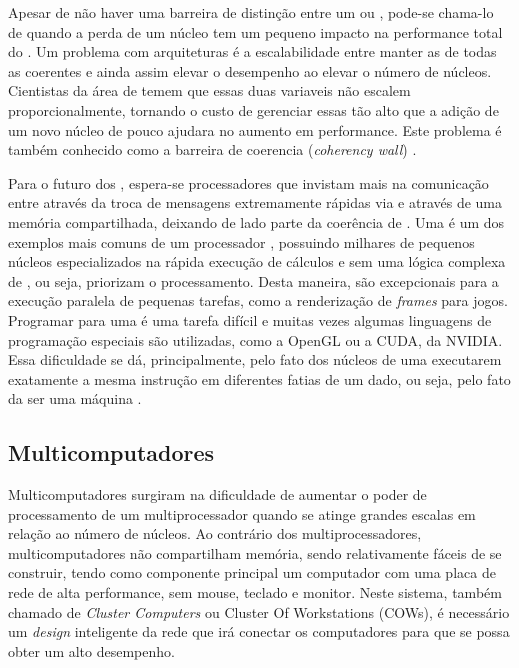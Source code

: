 Apesar de não haver uma barreira de distinção entre um \chip \manycore ou \multicore, pode-se chama-lo de \manycore quando a perda de um núcleo tem um pequeno impacto na performance total do \chip. Um problema com arquiteturas \manycore é a escalabilidade entre manter as \caches de todas as \CPUs coerentes e ainda assim elevar o desempenho ao elevar o número de núcleos. Cientistas da área de \HPC temem que essas duas variaveis não escalem proporcionalmente, tornando o custo de gerenciar essas \caches tão alto que a adição de um novo núcleo de pouco ajudara no aumento em performance. Este problema é também conhecido como a barreira de coerencia  (\textit{coherency wall}) \cite{TanenbaumMordenOS}.

Para o futuro dos \manycore, espera-se processadores que invistam mais  na comunicação entre \CPUs através da troca de mensagens extremamente rápidas via \hardware e através de uma memória compartilhada, deixando de lado parte da coerência de \cache. Uma \GPU é um dos exemplos mais comuns de um processador \manycore, possuindo milhares de pequenos núcleos especializados na rápida execução de cálculos e sem uma lógica complexa de \cache, ou seja, priorizam o processamento. Desta maneira, \GPUs são excepcionais para a execução paralela de pequenas tarefas, como a renderização de \textit{frames} para jogos. Programar para uma \GPU é uma tarefa difícil e muitas vezes algumas linguagens de programação especiais são utilizadas, como a OpenGL ou a CUDA, da NVIDIA. Essa dificuldade se dá, principalmente, pelo fato dos núcleos de uma \GPU executarem exatamente a mesma instrução em diferentes fatias de um dado, ou seja, pelo fato da \GPU ser uma máquina \SIMD.

\subsection{Multicomputadores}
\label{sec:multicomputadores}

Multicomputadores surgiram na dificuldade de aumentar o poder de processamento de um multiprocessador quando se atinge grandes escalas em relação ao número de núcleos. Ao contrário dos multiprocessadores, multicomputadores não compartilham memória, sendo relativamente fáceis de se construir, tendo como componente principal um computador com uma placa de rede de alta performance, sem mouse, teclado e monitor. Neste sistema, também chamado de \textit{Cluster Computers} ou {Cluster Of Workstations} (COWs), é necessário um \textit{design} inteligente da rede que irá conectar os computadores para que se possa obter um alto desempenho.

